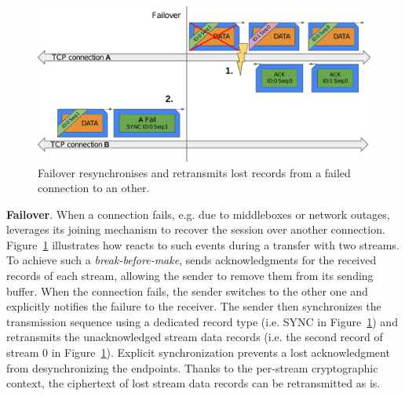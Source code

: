 \begin{figure}[!t]
	\begin{center}
		\includegraphics[width=\columnwidth]{figures/tcpls_failover}
	\end{center}
	\caption{Failover resynchronises and retransmits lost \tcpls records 
	from a failed \tcp connection to an other.}
	\label{fig:failover}
\end{figure}

\textbf{Failover}.
When a \tcp connection fails, e.g. due to middleboxes or network outages, 
\tcpls leverages its joining mechanism to recover 
the session over another \tcp connection. Figure~\ref{fig:failover} illustrates 
how \tcpls reacts to such events during a transfer with two \tcpls streams.
To achieve such a \emph{break-before-make}, 
\tcpls sends acknowledgments for the received records of each stream, allowing
the sender to remove them from its sending buffer.
When the \tcp connection fails, the sender switches to the other one and 
explicitly notifies the failure to the receiver. The sender then synchronizes 
the transmission sequence using a dedicated \tcpls record type (i.e. SYNC in 
Figure~\ref{fig:failover}) and retransmits the 
unacknowledged stream data records (i.e. the second record of stream 0 in 
Figure~\ref{fig:failover}). 
Explicit synchronization %
prevents a lost acknowledgment from desynchronizing the endpoints. 
Thanks to the per-stream cryptographic context, the ciphertext of lost stream 
data records can be retransmitted as is.


